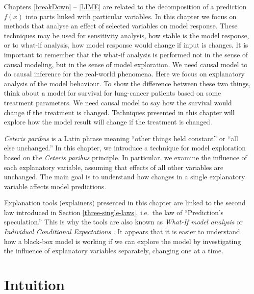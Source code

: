 \documentclass[]{krantz}
\begin{document}
Chapters \ref{breakDown} -- \ref{LIME} are related to the decomposition of a prediction \(f(x)\) into parts linked with particular variables. In this chapter we focus on methods that analyse an effect of selected variables on model response. These techniques may be used for sensitivity analysis, how stable is the model response, or to what-if analysis, how model response would change if input is changes. It is important to remember that the what-if analysis is performed not in the sense of causal modeling, but in the sense of model exploration. We need causal model to do causal inference for the real-world phenomena. Here we focus on explanatory analysis of the model behaviour. To show the difference between these two things, think about a model for survival for lung-cancer patients based on some treatment parameters. We need causal model to say how the survival would change if the treatment is changed. Techniques presented in this chapter will explore how the model result will change if the treatment is changed.

\emph{Ceteris paribus} is a Latin phrase meaning ``other things held constant'' or ``all else unchanged.'' In this chapter, we introduce a technique for model exploration based on the \emph{Ceteris paribus} principle. In particular, we examine the influence of each explanatory variable, assuming that effects of all other variables are unchanged. The main goal is to understand how changes in a single explanatory variable affects model predictions.

Explanation tools (explainers) presented in this chapter are linked to the second law introduced in Section \ref{three-single-laws}, i.e.~the law of ``Prediction's speculation.'' This is why the tools are also known as \emph{What-If model analysis} or \emph{Individual Conditional Expectations} \citep{ICEbox}. It appears that it is easier to understand how a black-box model is working if we can explore the model by investigating the influence of explanatory variables separately, changing one at a time.

\hypertarget{CPIntuition}{%
\section{Intuition}\label{CPIntuition}}
\end{document}
